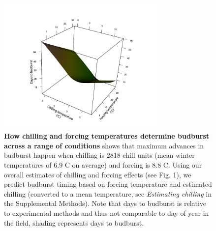 \documentclass{article}
\begin{document}
\begin{figure}[h!]
\centering
\noindent \includegraphics[width=0.75\textwidth]{..//..//analyses/bb_analysis/figures/bbmod_3dplot_utah_withPEP.png}
\caption{\textbf{How chilling and forcing temperatures determine budburst across a range of conditions} shows that maximum advances in budburst happen when chilling is 2818 chill units (mean winter temperatures of 6.9 \degree C on average) and forcing is 8.8 \degree C. Using our overall estimates of chilling and forcing effects (see Fig. 1), we predict budburst timing based on forcing temperature and estimated chilling (converted to a mean temperature, see \emph{Estimating chilling} in the Supplemental Methods). Note that days to budburst is relative to experimental methods and thus not comparable to day of year in the field, shading represents days to budburst.} %
\label{fig:apc}
\end{figure}
\newpage
\end{document}

